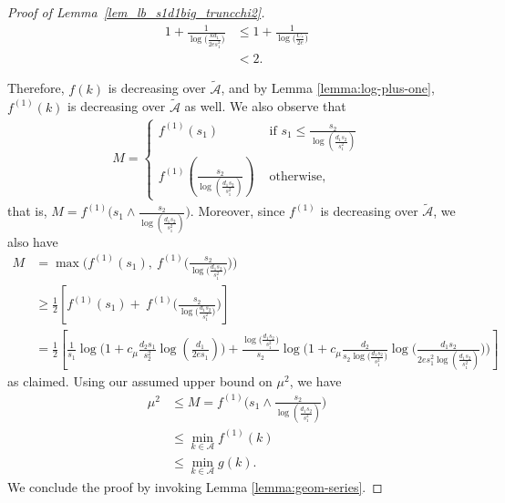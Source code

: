 \documentclass{article}
\newcommand{\cA}{\mathcal{A}}
\newcommand{\Ct}{C_{*}}
\theoremstyle{remark}
\begin{document}
\begin{proof}[Proof of Lemma~\ref{lem_lb_s1d1big_truncchi2}]
    \begin{align*}
        1 + \frac{1}{\log \big(\frac{kd_1}{2es_1^2}\big)} &\leq 1 + \frac{1}{\log\big(\frac{\Ct}{2e}\big)} \\
        &< 2.
    \end{align*}

    Therefore, $f(k)$ is decreasing over $\widetilde{\mathcal{A}}$, and by Lemma \ref{lemma:log-plus-one}, $f^{(1)}(k)$ is decreasing over $\widetilde{\mathcal{A}}$ as well. 
    We also observe that 
    \begin{align*}
        M = \begin{cases} f^{(1)}(s_1) & \text{ if } s_1 \leq \frac{s_2}{\log(\frac{d_1s_2}{s_1^2})}\\
        f^{(1)}(\frac{s_2}{\log(\frac{d_1s_2}{s_1^2})}) & \text{ otherwise,}
        \end{cases}
    \end{align*}
    that is, $M= f^{(1)}\Big(s_1 \land \frac{s_2}{\log(\frac{d_1s_2}{s_1^2})}\Big)$. 
    Moreover, since $f^{(1)}$ is decreasing over $\widetilde{\mathcal{A}}$, we also have
    \begin{align*}
        M &= \max\bigg(f^{(1)}(s_1), ~f^{(1)}\bigg(\frac{s_2}{\log\big(\frac{d_1s_2}{s_1^2}\big)}\bigg)\bigg) \\
        &\geq \frac{1}{2} \left[f^{(1)}(s_1) + ~f^{(1)}\bigg(\frac{s_2}{\log\big(\frac{d_1s_2}{s_1^2}\big)}\bigg)\right]\\
        & = \frac{1}{2} \left[\frac{1}{s_1}\log\Big(1 + c_\mu \frac{d_2s_1}{s_2^2}\log(\frac{d_1}{2es_1})\Big) + \frac{\log\big(\frac{d_1s_2}{s_1^2}\big)}{s_2}\log\Big(1 + c_\mu \frac{d_2}{s_2\log\big(\frac{d_1s_2}{s_1^2}\big)}\log\big(\frac{d_1s_2}{2es_1^2\log(\frac{d_1s_2}{s_1^2})}\big)\Big)\right]
    \end{align*}
    as claimed. 
    Using our assumed upper bound on $\mu^2$, we have 
    \begin{align*}
        \mu^2 &\leq M =  f^{(1)}\bigg(s_1 \land \frac{s_2}{\log(\frac{d_1s_2}{s_1^2})}\bigg) \\
        &\leq \min_{k \in \cA}f^{(1)}(k) \\
        &\leq \min_{k\in \cA}g(k).
    \end{align*}
    We conclude the proof by invoking Lemma \ref{lemma:geom-series}. 
\end{proof}
\end{document}
